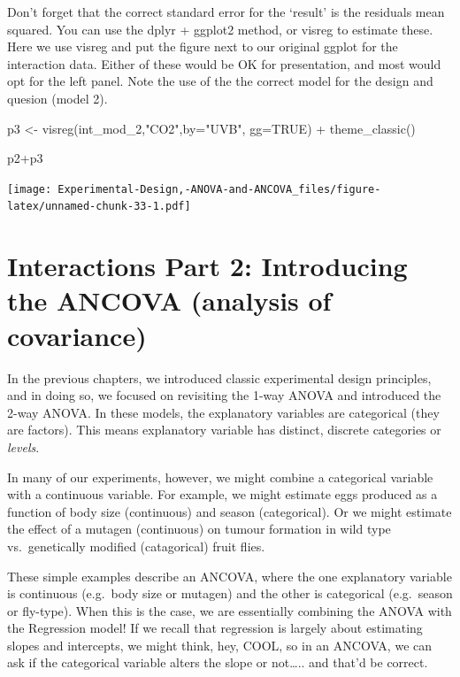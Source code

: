 \documentclass[
]{book}
\newenvironment{Shaded}{\begin{snugshade}}{\end{snugshade}}
\newcommand{\AttributeTok}[1]{\textcolor[rgb]{0.77,0.63,0.00}{#1}}
\newcommand{\ConstantTok}[1]{\textcolor[rgb]{0.00,0.00,0.00}{#1}}
\newcommand{\FunctionTok}[1]{\textcolor[rgb]{0.00,0.00,0.00}{#1}}
\newcommand{\NormalTok}[1]{#1}
\newcommand{\OtherTok}[1]{\textcolor[rgb]{0.56,0.35,0.01}{#1}}
\newcommand{\SpecialCharTok}[1]{\textcolor[rgb]{0.00,0.00,0.00}{#1}}
\newcommand{\StringTok}[1]{\textcolor[rgb]{0.31,0.60,0.02}{#1}}
\begin{document}
Don't forget that the correct standard error for the `result' is the residuals mean squared. You can use the dplyr + ggplot2 method, or visreg to estimate these. Here we use visreg and put the figure next to our original ggplot for the interaction data. Either of these would be OK for presentation, and most would opt for the left panel. Note the use of the the correct model for the design and quesion (model 2).

\begin{Shaded}
\begin{Highlighting}[]
\NormalTok{p3 }\OtherTok{\textless{}{-}} \FunctionTok{visreg}\NormalTok{(int\_mod\_2,}\StringTok{"CO2"}\NormalTok{,}\AttributeTok{by=}\StringTok{"UVB"}\NormalTok{, }\AttributeTok{gg=}\ConstantTok{TRUE}\NormalTok{) }\SpecialCharTok{+}
  \FunctionTok{theme\_classic}\NormalTok{()}

\NormalTok{p2}\SpecialCharTok{+}\NormalTok{p3}
\end{Highlighting}
\end{Shaded}

\texttt{[image: Experimental-Design,-ANOVA-and-ANCOVA\_files/figure-latex/unnamed-chunk-33-1.pdf]}

\hypertarget{interactions-part-2-introducing-the-ancova-analysis-of-covariance}{%
\chapter{Interactions Part 2: Introducing the ANCOVA (analysis of covariance)}\label{interactions-part-2-introducing-the-ancova-analysis-of-covariance}}

In the previous chapters, we introduced classic experimental design principles, and in doing so, we focused on revisiting the 1-way ANOVA and introduced the 2-way ANOVA. In these models, the explanatory variables are categorical (they are factors). This means explanatory variable has distinct, discrete categories or \emph{levels}.

In many of our experiments, however, we might combine a categorical variable with a continuous variable. For example, we might estimate eggs produced as a function of body size (continuous) and season (categorical). Or we might estimate the effect of a mutagen (continuous) on tumour formation in wild type vs.~genetically modified (catagorical) fruit flies.

These simple examples describe an ANCOVA, where the one explanatory variable is continuous (e.g.~body size or mutagen) and the other is categorical (e.g.~season or fly-type). When this is the case, we are essentially combining the ANOVA with the Regression model! If we recall that regression is largely about estimating slopes and intercepts, we might think, hey, COOL, so in an ANCOVA, we can ask if the categorical variable alters the slope or not\ldots.. and that'd be correct.
\end{document}
